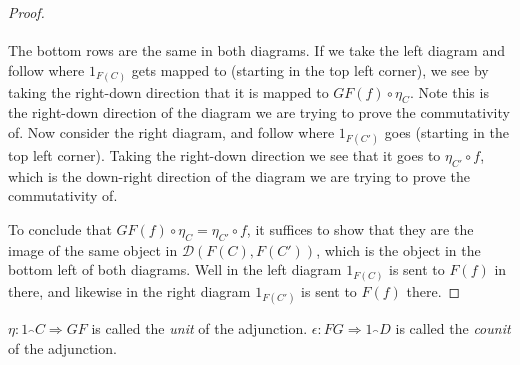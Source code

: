 \documentclass[12pt]{article}
\begin{document}
\begin{proof}
\begin{equation*}
\begin{tikzcd}
\end{tikzcd}
	\end{equation*}
	The bottom rows are the same in both diagrams. If we take the left diagram and follow where $1_{F(C)}$ gets mapped to (starting in the top left corner), we see by taking the right-down direction that it is mapped to $GF(f)\circ \eta_C$. Note this is the right-down direction of the diagram we are trying to prove the commutativity of. Now consider the right diagram, and follow where $1_{F(C')}$ goes (starting in the top left corner). Taking the right-down direction we see that it goes to $\eta_{C'}\circ f$, which is the down-right direction of the diagram we are trying to prove the commutativity of. 

	To conclude that $GF(f)\circ \eta_C=\eta_{C'}\circ f$, it suffices to show that they are the image of the same object in $\mathcal{D}(F(C), F(C'))$, which is the object in the bottom left of both diagrams. Well in the left diagram $1_{F(C)}$ is sent to $F(f)$ in there, and likewise in the right diagram $1_{F(C')}$ is sent to $F(f)$ there.
\end{proof}

\begin{definition}
	$\eta:1_\cat{C}\Rightarrow GF$ is called the \emph{unit} of the adjunction. $\epsilon:FG\Rightarrow 1_\cat{D}$ is called the \emph{counit} of the adjunction.
\end{definition}
\end{document}

